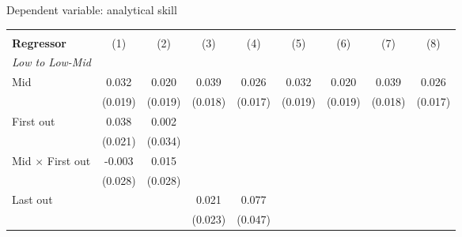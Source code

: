 \begin{center}
\begin{threeparttable}[!h]
\caption{Dependent variable: analytical skill}
\begin{tabular}{lcccccccc}
\toprule
\toprule
&\multicolumn{1}{c}{\textbf{}}&\multicolumn{1}{c}{\textbf{}}&\multicolumn{1}{c}{\textbf{}}&\multicolumn{1}{c}{\textbf{}}&\multicolumn{1}{c}{\textbf{}}&\multicolumn{1}{c}{\textbf{}}&\multicolumn{1}{c}{\textbf{}}&\multicolumn{1}{c}{\textbf{}} \\
\textbf{Regressor}&\multicolumn{1}{c}{(1)}&\multicolumn{1}{c}{(2)}&\multicolumn{1}{c}{(3)}&\multicolumn{1}{c}{(4)}&\multicolumn{1}{c}{(5)}&\multicolumn{1}{c}{(6)}&\multicolumn{1}{c}{(7)}&\multicolumn{1}{c}{(8)} \\
\midrule
\textit{Low to Low-Mid} \\
Mid                 &       0.032         &       0.020         &       0.039\sym{*}  &       0.026         &       0.032         &       0.020         &       0.039\sym{*}  &       0.026         \\
                    &     (0.019)         &     (0.019)         &     (0.018)         &     (0.017)         &     (0.019)         &     (0.019)         &     (0.018)         &     (0.017)         \\
First out           &       0.038         &       0.002         &                     &                     &                     &                     &                     &                     \\
                    &     (0.021)         &     (0.034)         &                     &                     &                     &                     &                     &                     \\
Mid $\times$ First out&      -0.003         &       0.015         &                     &                     &                     &                     &                     &                     \\
                    &     (0.028)         &     (0.028)         &                     &                     &                     &                     &                     &                     \\
Last out            &                     &                     &       0.021         &       0.077         &                     &                     &                     &                     \\
                    &                     &                     &     (0.023)         &     (0.047)         &                     &                     &                     &                     \\

\end{tabular}
\end{threeparttable}
\end{center}
